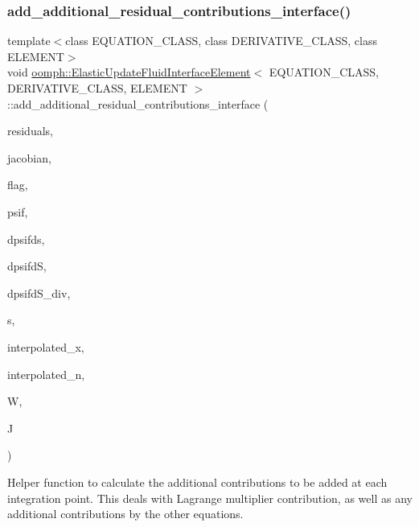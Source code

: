 \subsubsection{\texorpdfstring{add\+\_\+additional\+\_\+residual\+\_\+contributions\+\_\+interface()}{add\_additional\_residual\_contributions\_interface()}}
{\footnotesize\ttfamily template$<$class E\+Q\+U\+A\+T\+I\+O\+N\+\_\+\+C\+L\+A\+SS, class D\+E\+R\+I\+V\+A\+T\+I\+V\+E\+\_\+\+C\+L\+A\+SS, class E\+L\+E\+M\+E\+NT$>$ \\
void \hyperlink{classoomph_1_1ElasticUpdateFluidInterfaceElement}{oomph\+::\+Elastic\+Update\+Fluid\+Interface\+Element}$<$ E\+Q\+U\+A\+T\+I\+O\+N\+\_\+\+C\+L\+A\+SS, D\+E\+R\+I\+V\+A\+T\+I\+V\+E\+\_\+\+C\+L\+A\+SS, E\+L\+E\+M\+E\+NT $>$\+::add\+\_\+additional\+\_\+residual\+\_\+contributions\+\_\+interface (\begin{DoxyParamCaption}\item[{\hyperlink{classoomph_1_1Vector}{Vector}$<$ double $>$ \&}]{residuals,  }\item[{\hyperlink{classoomph_1_1DenseMatrix}{Dense\+Matrix}$<$ double $>$ \&}]{jacobian,  }\item[{const unsigned \&}]{flag,  }\item[{const \hyperlink{classoomph_1_1Shape}{Shape} \&}]{psif,  }\item[{const \hyperlink{classoomph_1_1DShape}{D\+Shape} \&}]{dpsifds,  }\item[{const \hyperlink{classoomph_1_1DShape}{D\+Shape} \&}]{dpsifdS,  }\item[{const \hyperlink{classoomph_1_1DShape}{D\+Shape} \&}]{dpsifd\+S\+\_\+div,  }\item[{const \hyperlink{classoomph_1_1Vector}{Vector}$<$ double $>$ \&}]{s,  }\item[{const \hyperlink{classoomph_1_1Vector}{Vector}$<$ double $>$ \&}]{interpolated\+\_\+x,  }\item[{const \hyperlink{classoomph_1_1Vector}{Vector}$<$ double $>$ \&}]{interpolated\+\_\+n,  }\item[{const double \&}]{W,  }\item[{const double \&}]{J }\end{DoxyParamCaption})\hspace{0.3cm}{\ttfamily [inline]}}



Helper function to calculate the additional contributions to be added at each integration point. This deals with Lagrange multiplier contribution, as well as any additional contributions by the other equations. 



